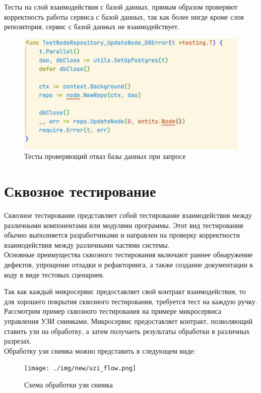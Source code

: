 Тесты на слой взаимодействия с базой данных, прямым образом проверяют корректность работы сервиса с базой данных,
так как более нигде кроме слоя репозитория, сервис с базой данных не взаимодействует.
\begin{figure}[H]%
	\begin{center}
		\includegraphics[width=.7\columnwidth]{./img/new/integration_test.png}%
	\end{center}
	\caption{Тесты проверяющий отказ базы данных при запросе}%
	\label{pic:repository_test}%
\end{figure}

\section{Сквозное тестирование}
Сквозное тестирование представляет собой тестирование взаимодействия между различными компонентами или модулями программы. 
Этот вид тестирования обычно выполняется разработчиками и направлен на проверку корректности взаимодействия между различными частями системы.\\

Основные преимущества сквозного тестирования включают раннее обнаружение дефектов, упрощение отладки и рефакторинга, а также создание 
документации к коду в виде тестовых сценариев.

Так как каждый микросервис предоставляет свой контракт взаимодействия, то для хорошего покрытия сквозного тестирования, требуется тест на каждую ручку.
Рассмотрим пример сквозного тестирования на примере микросервиса управления УЗИ снимками. Микросервис предоставляет контракт,
позволяющий ставить узи на обработку, а затем получаеть результаты обработки в различных разрезах.\\
Обработку узи снимка можно представить в следующем виде:
\begin{figure}[H]%
	\begin{center}
		\texttt{[image: ./img/new/uzi\_flow.png]}%
	\end{center}
	\caption{Схема обработки узи снимка}%
	\label{pic:uzi_flow}%
\end{figure}

